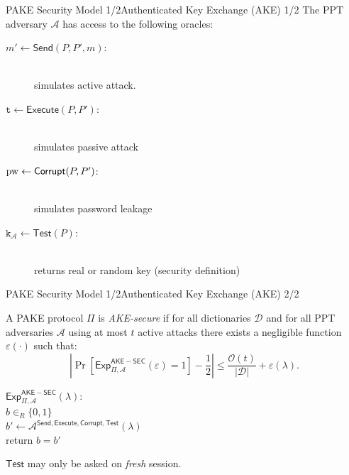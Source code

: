 \documentclass[notes,xcolor=dvipsnames]{beamer}
\begin{document}
\begin{frame}{PAKE Security Model 1/2}{Authenticated Key Exchange (AKE) 1/2}
The PPT adversary $\mathcal{A}$ has access to the following oracles:
\begin{description}
    \item[$m'\gets\mathsf{Send}(P,P',m)$:] \hfill \\ simulates active attack.
    \item[$\mathtt{t}\gets\mathsf{Execute}(P,P')$:] \hfill \\ simulates passive attack
    \item[$\mathrm{pw}\gets\mathsf{Corrupt}(P, P')$:] \hfill \\ simulates password leakage
    \item[$\mathtt{k}_\mathcal{A}\gets\mathsf{Test}(P)$:] \hfill \\ returns real or random key (security definition)
\end{description}
\end{frame}

\begin{frame}{PAKE Security Model 1/2}{Authenticated Key Exchange (AKE) 2/2}
\begin{definition}\label{def:ake}
A PAKE protocol $\Pi$ is \emph{AKE-secure} if for all dictionaries $\mathcal{D}$ and for all PPT adversaries $\mathcal{A}$ using at most $t$ active attacks there exists a negligible function $\varepsilon(\cdot)$ such that:
\[\left|\Pr[\mathsf{Exp}_{\Pi,\mathcal{A}}^{\mathsf{AKE-SEC}}(\varepsilon)=1]-\frac12\right|\leq \frac{\mathcal{O}(t)}{|\mathcal{D}|}+\varepsilon(\lambda).\]

\noindent$\mathsf{Exp}_{\Pi,\mathcal{A}}^{\mathsf{AKE-SEC}}(\lambda):$ \\
\hspace*{2em} $b\in_R\{0,1\}$\\
\hspace*{2em} $b'\gets\mathcal{A}^{\mathsf{Send},\mathsf{Execute},\mathsf{Corrupt},\mathsf{Test}}(\lambda)$\\
\hspace*{2em} return $b=b'$
\end{definition}
$\mathsf{Test}$ may only be asked on \emph{fresh} session.
\end{frame}
\end{document}
